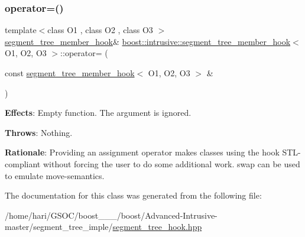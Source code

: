 \subsubsection{\texorpdfstring{operator=()}{operator=()}}
{\footnotesize\ttfamily template$<$class O1 , class O2 , class O3 $>$ \\
\hyperlink{classboost_1_1intrusive_1_1segment__tree__member__hook}{segment\+\_\+tree\+\_\+member\+\_\+hook}\& \hyperlink{classboost_1_1intrusive_1_1segment__tree__member__hook}{boost\+::intrusive\+::segment\+\_\+tree\+\_\+member\+\_\+hook}$<$ O1, O2, O3 $>$\+::operator= (\begin{DoxyParamCaption}\item[{const \hyperlink{classboost_1_1intrusive_1_1segment__tree__member__hook}{segment\+\_\+tree\+\_\+member\+\_\+hook}$<$ O1, O2, O3 $>$ \&}]{ }\end{DoxyParamCaption})}

{\bfseries Effects}\+: Empty function. The argument is ignored.

{\bfseries Throws}\+: Nothing.

{\bfseries Rationale}\+: Providing an assignment operator makes classes using the hook S\+T\+L-\/compliant without forcing the user to do some additional work. {\ttfamily swap} can be used to emulate move-\/semantics. 

The documentation for this class was generated from the following file\+:\begin{DoxyCompactItemize}
\item 
/home/hari/\+G\+S\+O\+C/boost\+\_\+\_\+\_/boost/\+Advanced-\/\+Intrusive-\/master/segment\+\_\+tree\+\_\+imple/\hyperlink{segment__tree__hook_8hpp}{segment\+\_\+tree\+\_\+hook.\+hpp}\end{DoxyCompactItemize}
